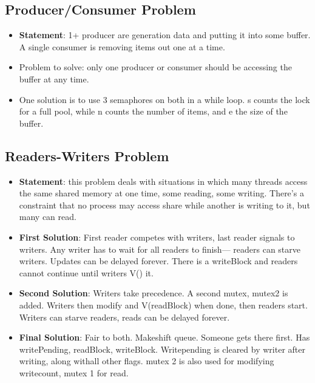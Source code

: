 \documentclass[fontsize=5pt]{scrartcl}
\begin{document}
\begin{multicols}{3}
      \subsection{Producer/Consumer Problem}
      \begin{itemize}
        \item \textbf{Statement}: 1+ producer are generation data and putting it into some buffer. A single consumer is removing items out one at a time.
        \item Problem to solve: only one producer or consumer should be accessing the buffer at any time.
        \item One solution is to use 3 semaphores on both in a while loop. s counts the lock for a full pool, while n counts the number of items, and e the size of the buffer.
        
      \end{itemize}
      
      \subsection{Readers-Writers Problem}
        \begin{itemize}
          \item \textbf{Statement}: this problem deals with situations in which many threads access the same shared memory at one time, some reading, some writing. 
                There's a constraint that no process may access share while another is writing to it, but many can read.
          \item \textbf{First Solution}: First reader competes with writers, last reader signals to writers. Any writer has to wait for all readers to finish--- readers can starve writers.
                Updates can be delayed forever. There is a writeBlock and readers cannot continue until writers V() it.
          \item \textbf{Second Solution}: Writers take precedence. A second mutex, mutex2 is added. Writers then modify and V(readBlock) when done, then readers start. Writers can starve readers, reads can be delayed forever.
          \item \textbf{Final Solution}: Fair to both. Makeshift queue. Someone gets there first. Has writePending, readBlock, writeBlock. Writepending is cleared by writer after writing, along withall other flags. mutex 2 is also
                 used for modifying writecount, mutex 1 for read.  


\end{itemize}
\end{multicols}
\end{document}
